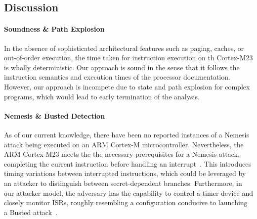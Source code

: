 \subsection{Discussion}

\paragraph{\textbf{Soundness \& Path Explosion}}
%
In the absence of
sophisticated architectural features such as paging, caches, or
out-of-order execution, the time taken for instruction
execution on th Cortex-M23 is wholly deterministic. Our approach is sound
in the sense that it follows the instruction semantics and execution times
of the processor documentation. However, our approach is incompete due to
state and path explosion for complex programs, which would lead to early
termination of the analysis.

\paragraph{\textbf{Nemesis \& Busted Detection}}
%
As of our current knowledge, there have been no reported instances of a
Nemesis attack being executed on an ARM Cortex-M microcontroller.
Nevertheless, the ARM Cortex-M23 meets the 
the necessary prerequisites for a Nemesis attack,
completing the current instruction before
handling an interrupt~\cite{Nemesis}. This  introduces timing variations between
interrupted instructions, which could be leveraged by an attacker to
distinguish between secret-dependent branches. Furthermore, in our attacker
model, the adversary has the capability to control a timer device and
closely monitor \acp{ISR}, roughly resembling a configuration conducive to
launching a Busted attack~\cite{busted}.

% 

